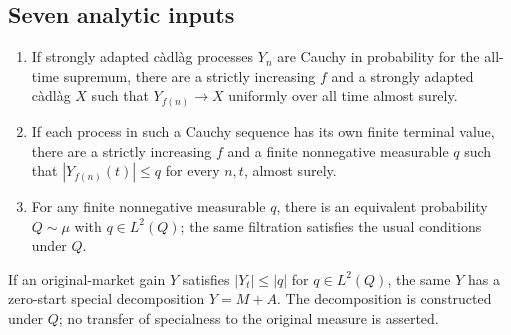 \subsection{Seven analytic inputs}
\begin{proposition}\label{input:paths}
\leavevmode\par
\begin{enumerate}
\item {}
If strongly adapted c\`adl\`ag processes $Y_n$ are Cauchy in probability for the all-time supremum,
there are a strictly increasing $f$ and a strongly adapted c\`adl\`ag $X$ such that $Y_{f(n)}\to X$ uniformly over all time almost surely.
\item {}
If each process in such a Cauchy sequence has its own finite terminal value, there are a strictly increasing $f$
and a finite nonnegative measurable $q$ such that $|Y_{f(n)}(t)|\leq q$ for every $n,t$, almost surely.
\item {}
For any finite nonnegative measurable $q$, there is an equivalent probability $Q\sim\mu$ with $q\in L^2(Q)$;
the same filtration satisfies the usual conditions under $Q$.
\end{enumerate}
\end{proposition}

\begin{proposition}\label{input:decomposition}
If an original-market gain $Y$ satisfies $|Y_t|\leq|q|$ for $q\in L^2(Q)$,
the same $Y$ has a zero-start special decomposition $Y=M+A$.
The decomposition is constructed under $Q$; no transfer of specialness to the original measure is asserted.
\end{proposition}

